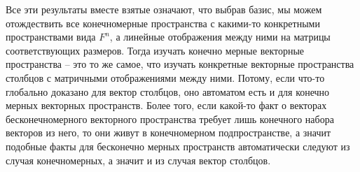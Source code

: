 Все эти результаты вместе взятые означают, что выбрав базис, мы можем отождествить все конечномерные пространства с какими-то конкретными пространствами вида $F^n$, а линейные отображения между ними на матрицы соответствующих размеров.
Тогда изучать конечно мерные векторные пространства -- это то же самое, что изучать конкретные векторные пространства столбцов с матричными отображениями между ними.
Потому, если что-то глобально доказано для вектор столбцов, оно автоматом есть и для конечно мерных векторных пространств.
Более того, если какой-то факт о векторах бесконечномерного векторного пространства требует лишь конечного набора векторов из него, то они живут в конечномерном подпространстве, а значит подобные факты для бесконечно мерных пространств автоматически следуют из случая конечномерных, а значит и из случая вектор столбцов.
